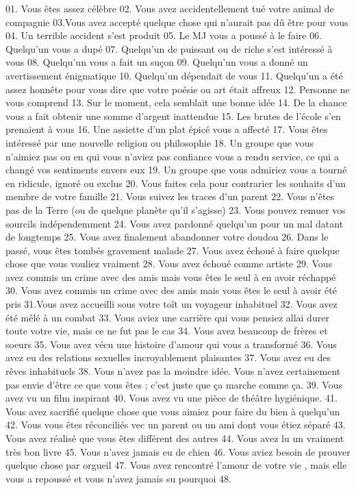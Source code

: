 
\begin{tabular}
  01. Vous êtes assez célèbre
  02. Vous avez accidentellement tué votre animal de compagnie
  03.Vous avez accepté quelque chose qui n'aurait pas dû être pour vous
  04. Un terrible accident s'est produit
  05. Le MJ vous a poussé à le faire
  06. Quelqu'un vous a dupé
  07. Quelqu'un de puissant ou de riche s'est intéressé à vous
  08. Quelqu'un vous a fait un suçon
  09. Quelqu'un vous a donné un avertissement énigmatique
  10. Quelqu'un dépendait de vous
  11. Quelqu'un a été assez honnête pour vous dire que votre poésie ou art était affreux
  12. Personne ne vous comprend
  13. Sur le moment, cela semblait une bonne idée
  14. De la chance vous a fait obtenir une somme d'argent inattendue
  15. Les brutes de l'école s'en prenaient à vous
  16. Une assiette d'un plat épicé vous a affecté
  17. Vous êtes intéressé par une nouvelle religion ou philosophie
  18. Un groupe que vous n'aimiez pas ou en qui vous n'aviez pas confiance vous a rendu service, ce qui a changé vos sentiments envers eux
  19. Un groupe que vous admiriez vous a tourné en ridicule, ignoré ou exclus
  20. Vous faites cela pour contrarier les souhaits d'un membre de votre famille
  21. Vous suivez les traces d'un parent
  22. Vous n'êtes pas de la Terre (ou de quelque planète qu'il s'agisse)
  23. Vous pouvez remuer vos sourcils indépendemment
  24. Vous avez pardonné quelqu'un pour un mal datant de longtemps
  25. Vous avez finalement abandonner votre doudou
  26. Dans le passé, vous êtes tombés gravement malade
  27. Vous avez échoué à faire quelque chose que vous vouliez vraiment
  28. Vous avez échoué comme artiste
  29. Vous avez commis un crime avec des amis mais vous êtes le seul à en avoir réchappé
  30. Vous avez commis un crime avec des amis mais vous êtes le seul à avoir été pris
  31.Vous avez accueilli sous votre toît un voyageur inhabituel
  32. Vous avez été mêlé à un combat
  33. Vous aviez une carrière qui vous pensiez allai durer toute votre vie, mais ce ne fut pas le cas
  34. Vous avez beaucoup de frères et soeurs
  35. Vous avez vécu une histoire d'amour qui vous a transformé
  36. Vous avez eu des relations sexuelles incroyablement plaisantes
  37. Vous avez eu des rêves inhabituels
  38. Vous n'avez pas la moindre idée. Vous n'avez certainement pas envie d'être ce que vous êtes ; c'est juste que ça marche comme ça.
  39. Vous avez vu un film inspirant
  40. Vous avez vu une pièce de théâtre hygiénique.
  41. Vous avez sacrifié quelque chose que vous aimiez pour faire du bien à quelqu'un
  42. Vous vous êtes réconciliés vec un parent ou un ami dont vous étiez séparé
  43. Vous avez réalisé que vous êtes différent des autres
  44. Vous avez lu un vraiment très bon livre
  45. Vous n'avez jamais eu de chien
  46. Vous aviez besoin de prouver quelque chose par orgueil
  47. Vous avez rencontré l'amour de votre vie , mais elle vous a repoussé et vous n'avez jamais su pourquoi
  48. 
\end{tabular}
